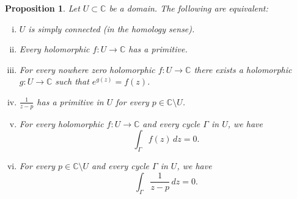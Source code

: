 \documentclass[12pt,openany]{book}
\newcommand{\C}{{\mathbb{C}}}
\theoremstyle{plain}
\newtheorem{prop}[thm]{Proposition}
\theoremstyle{remark}
\theoremstyle{definition}
\theoremstyle{exercise}
\theoremstyle{example}
\begin{document}
\begin{prop}
Let $U \subset \C$ be a domain.  The following are equivalent:
\begin{enumerate}[(i)]
\item \label{thm:simplyconnected:i}
$U$ is simply connected (in the homology sense).
\item \label{thm:simplyconnected:ii}
Every holomorphic $f \colon U \to \C$ has a primitive.
\item \label{thm:simplyconnected:iii}
For every nowhere zero holomorphic $f \colon U \to \C$ there exists
a holomorphic $g \colon U \to \C$ such that $e^{g(z)} = f(z)$.
\item \label{thm:simplyconnected:iv}
$\frac{1}{z-p}$ has a primitive in $U$ for every $p \in \C \setminus U$.
\item \label{thm:simplyconnected:v}
For every holomorphic $f \colon U \to \C$ and every
cycle $\Gamma$ in $U$, we have
\begin{equation*}
\int_\Gamma f(z) \, dz = 0 .
\end{equation*}
\item \label{thm:simplyconnected:vi}
For every $p \in \C \setminus U$ and every
cycle $\Gamma$ in $U$, we have
\begin{equation*}
\int_\Gamma \frac{1}{z-p} \, dz = 0 .
\end{equation*}
\end{enumerate}
\end{prop}
\end{document}
